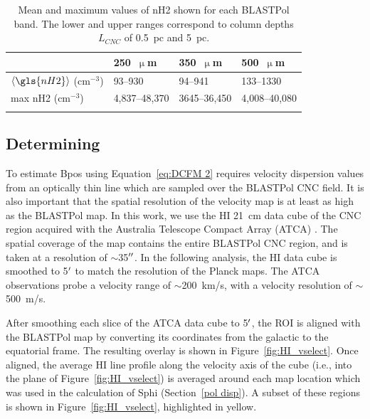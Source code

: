 \begin{table}[hbtp]
  \centering
\begin{tabular}{@{}llll@{}}
\dtoprule
                            & 250~$\upmu$m     & 350~$\upmu$m     & 500~$\upmu$m     \\ \midrule
$\langle \gls{nH2} \rangle$ ($\mathrm{cm}^{-3}$) & 93--930      & 94--941      & 133--1330    \\
max \gls{nH2} ($\mathrm{cm}^{-3}$)             & 4,837--48,370 & 3645--36,450 & 4,008--40,080
\\ \bottomrule
\\
\end{tabular}
\centering
\caption[~Mean and maximum values of  shown for each BLASTPol band.]{Mean and maximum values of \gls{nH2} shown for each BLASTPol band. The lower and upper ranges correspond to column depths $L_{CNC}$ of 0.5~pc and 5~pc.}
\label{table:nH2}
\end{table}

\subsection{Determining }\label{sigV}

To estimate \gls{Bpos} using Equation~\ref{eq:DCFM 2} requires velocity dispersion values from an optically thin line which are sampled over the BLASTPol CNC field. It is also important that the spatial resolution of the velocity map is at least as high as the BLASTPol map. In this work, we use the $\mathrm{HI}$ 21~cm data cube of the CNC region acquired with the Australia Telescope Compact Array (ATCA) \citep{rebolledo2017carina}. The spatial coverage of the map contains the entire BLASTPol CNC region, and is taken at a resolution of $\sim$35$\operatorname{^{\prime\prime}}$. In the following analysis, the $\mathrm{HI}$ data cube is smoothed to 5$\operatorname{^{\prime}}$ to match the resolution of the Planck maps. The ATCA observations probe a velocity range of $\sim$200~km/s, with a velocity resolution of $\sim$500~m/s.

After smoothing each slice of the ATCA data cube to 5$\operatorname{^{\prime}}$, the ROI is aligned with the BLASTPol map by converting its coordinates from the galactic to the equatorial frame. The resulting overlay is shown in Figure~\ref{fig:HI_vselect}. Once aligned, the average $\mathrm{HI}$ line profile along the velocity axis of the cube (i.e., into the plane of Figure~\ref{fig:HI_vselect}) is averaged around each map location which was used in the calculation of \gls{Sphi} (Section~\ref{pol disp}). A subset of these regions is shown in Figure~\ref{fig:HI_vselect}, highlighted in yellow.

